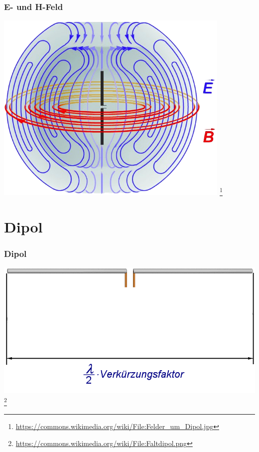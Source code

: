 \begin{frame}
    \frametitle{E- und H-Feld}
    \begin{center}
        \includegraphics[width=0.85\textwidth]{e11/Felder_um_Dipol.png}
        \footnote{\tiny \url{https://commons.wikimedia.org/wiki/File:Felder_um_Dipol.jpg}}
	\end{center}
\end{frame}


\section*{Dipol}

\begin{frame}
    \frametitle{Dipol}
    \begin{center}
        \includegraphics[width=1\textwidth]{e11/Faltdipol.png}
        \footnote{\tiny \url{https://commons.wikimedia.org/wiki/File:Faltdipol.png}}
	\end{center}
\end{frame}


